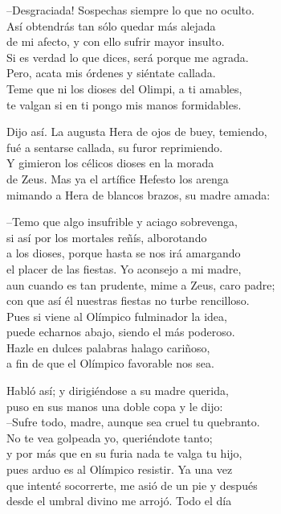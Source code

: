 \documentclass[11pt,twoside]{article}
\begin{document}
--Desgraciada! Sospechas siempre lo que no oculto.\\
Así obtendrás tan sólo quedar más alejada\\
de mi afecto, y con ello sufrir mayor insulto.\\
Si es verdad lo que dices, será porque me agrada.\\
Pero, acata mis órdenes y siéntate callada.\\
Teme que ni los dioses del Olimpi, a ti amables,\\
te valgan si en ti pongo mis manos formidables.\par
Dijo así. La augusta Hera de ojos de buey, temiendo,\\
fué a sentarse callada, su furor reprimiendo.\\
Y gimieron los célicos dioses en la morada\\
de Zeus. Mas ya el artífice Hefesto los arenga\\
mimando a Hera de blancos brazos, su madre amada:\par
--Temo que algo insufrible y aciago sobrevenga,\\
si así por los mortales reñís, alborotando\\
a los dioses, porque hasta se nos irá amargando\\
el placer de las fiestas. Yo aconsejo a mi madre,\\
aun cuando es tan prudente, mime a Zeus, caro padre;\\
con que así él nuestras fiestas no turbe rencilloso.\\
Pues si viene al Olímpico fulminador la idea,\\
puede echarnos abajo, siendo el más poderoso.\\
Hazle en dulces palabras halago cariñoso,\\
a fin de que el Olímpico favorable nos sea.\par
Habló así; y dirigiéndose a su madre querida,\\
puso en sus manos una doble copa y le dijo:\\
--Sufre todo, madre, aunque sea cruel tu quebranto.\\
No te vea golpeada yo, queriéndote tanto;\\
y por más que en su furia nada te valga tu hijo,\\
pues arduo es al Olímpico resistir. Ya una vez\\
que intenté socorrerte, me asió de un pie y después\\
desde el umbral divino me arrojó. Todo el día\\
\end{document}
